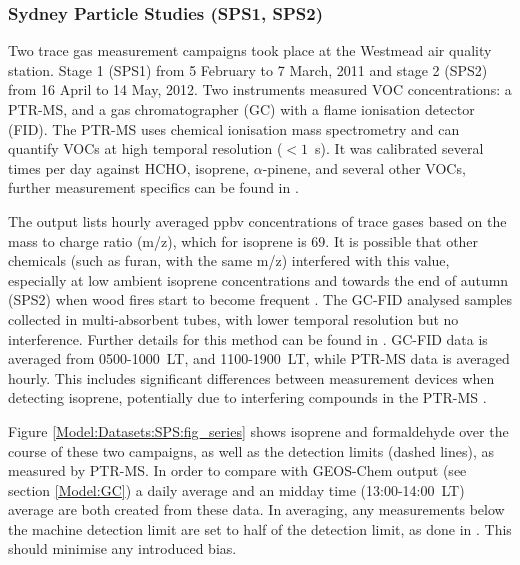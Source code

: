     \subsubsection{Sydney Particle Studies (SPS1, SPS2)}
    \label{Model:Datasets:SPS}
      Two trace gas measurement campaigns took place at the Westmead air quality station. %
      Stage 1 (SPS1) from 5 February to 7 March, 2011 and stage 2 (SPS2) from 16 April to 14 May, 2012.
      Two instruments measured VOC concentrations: a PTR-MS, and a gas chromatographer (GC) with a flame ionisation detector (FID).
      The PTR-MS uses chemical ionisation mass spectrometry and can quantify VOCs at high temporal resolution ($< 1$~s).
      It was calibrated several times per day against HCHO, isoprene, $\alpha$-pinene, and several other VOCs, further measurement specifics can be found in \textcite{Dunne2018}.
      
      The output lists hourly averaged ppbv concentrations of trace gases based on the mass to charge ratio (m/z), which for isoprene is 69.
      It is possible that other chemicals (such as furan, with the same m/z) interfered with this value, especially at low ambient isoprene concentrations and towards the end of autumn (SPS2) when wood fires start to become frequent \parencite{Guerette2018}.
      The GC-FID analysed samples collected in multi-absorbent tubes, with lower temporal resolution but no interference. 
      Further details for this method can be found in \textcite{Cheng2016}.
      GC-FID data is averaged from 0500-1000~LT, and 1100-1900~LT, while PTR-MS data is averaged hourly.
      This includes significant differences between measurement devices when detecting isoprene, potentially due to interfering compounds in the PTR-MS \parencite{Dunne2018}.
      
      Figure \ref{Model:Datasets:SPS:fig_series} shows isoprene and formaldehyde over the course of these two campaigns, as well as the detection limits (dashed lines), as measured by PTR-MS. 
      In order to compare with GEOS-Chem output (see section \ref{Model:GC}) a daily average and an midday time (13:00-14:00~LT) average are both created from these data.
      In averaging, any measurements below the machine detection limit are set to half of the detection limit, as done in \textcite{Lawson2015}. 
      This should minimise any introduced bias.
      
      {\label{Model:Datasets:SPS:fig_series}}
    
